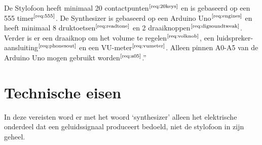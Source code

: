 \documentclass[12pt, a4paper, dutch]{article}
\newcommand{\req}[1]{$^{\text{\ref{req:#1}}}$}
\begin{document}
De Stylofoon heeft minimaal 20 contactpunten\req{20keys} en is gebaseerd op een 555
timer\req{555}. De Synthesizer is gebaseerd op een Arduino Uno\req{engines} en heeft
minimaal 8 druktoetsen\req{readtone} en 2 draaiknoppen\req{digsoundtweak}. Verder is
er een draaiknop om het volume te regelen\req{volknob}, een
luidspreker-aansluiting\req{phonesout} en een VU-meter\req{vumeter}. Alleen pinnen
A0-A5 van de Arduino Uno mogen gebruikt worden\req{a05}.''

\section{Technische eisen}

In deze vereisten word er met het woord `synthesizer' alleen het elektrische
onderdeel dat een geluidssignaal produceert bedoeld, niet de stylofoon in zijn
geheel.
\end{document}
